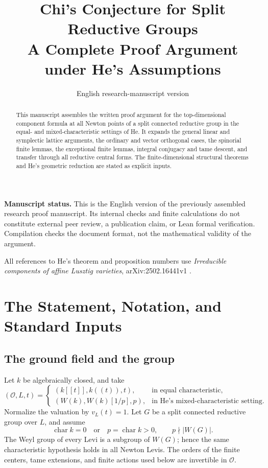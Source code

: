 \documentclass[11pt,a4paper]{article}
\title{Chi's Conjecture for Split Reductive Groups\\
  \large A Complete Proof Argument under He's Assumptions}
\author{}
\date{English research-manuscript version}
\theoremstyle{definition}
\theoremstyle{remark}
\begin{document}
\maketitle
\begin{abstract}
This manuscript assembles the written proof argument for the
top-dimensional component formula at all Newton points of a split
connected reductive group in the equal- and mixed-characteristic
settings of He. It expands the general linear and symplectic lattice
arguments, the ordinary and vector orthogonal cases, the spinorial
finite lemmas, the exceptional finite lemmas, integral conjugacy and
tame descent, and transfer through all reductive central forms.
The finite-dimensional structural theorems and He's geometric
reduction are stated as explicit inputs.
\end{abstract}

\noindent\textbf{Manuscript status.}
This is the English version of the previously assembled research
proof manuscript. Its internal checks and finite calculations do not
constitute external peer review, a publication claim, or Lean formal
verification. Compilation checks the document format, not the
mathematical validity of the argument.

\medskip
\noindent All references to He's theorem and proposition numbers use
\emph{Irreducible components of affine Lusztig varieties},
arXiv:2502.16441v1 \cite{he}.

\tableofcontents
\clearpage

\section{The Statement, Notation, and Standard Inputs}\label{sec:assumptions}

\subsection{The ground field and the group}
Let \(k\) be algebraically closed, and take
\[
(\mathcal O,L,t)=
\begin{cases}
(k[[t]],k((t)),t),&\text{in equal characteristic},\\
(W(k),W(k)[1/p],p),&\text{in He's mixed-characteristic setting}.
\end{cases}
\]
Normalize the valuation by \(v_L(t)=1\). Let \(G\) be a split connected
reductive group over \(L\), and assume
\[
\operatorname{char}k=0
\quad\text{or}\quad
p=\operatorname{char}k>0,\qquad p\nmid |W(G)|.
\]
The Weyl group of every Levi is a subgroup of \(W(G)\); hence the same
characteristic hypothesis holds in all Newton Levis. The orders of
the finite centers, tame extensions, and finite actions used below
are invertible in \(\mathcal O\).
\end{document}
